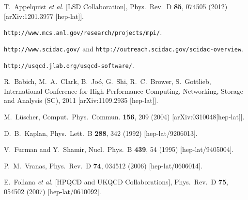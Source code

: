 \begin{thebibliography}{99}
  T.~Appelquist {\it et al.} [LSD Collaboration],
  Phys.\ Rev.\ D {\bf 85}, 074505 (2012)
  [arXiv:1201.3977 [hep-lat]].
  

  
 
{\tt http://www.mcs.anl.gov/research/projects/mpi/}.

{\tt http://www.scidac.gov/} and {\tt http://outreach.scidac.gov/scidac-overview}.
  
{\tt http://usqcd.jlab.org/usqcd-software/}.

  R.~Babich, M.~A.~Clark, B.~Jo\'{o}, G.~Shi, R.~C.~Brower, S.~Gottlieb,
  International Conference for High Performance Computing, Networking, Storage and Analysis (SC), 2011
  [arXiv:1109.2935 [hep-lat]].

  M.\ L\"{u}scher,
  Comput.\ Phys.\ Commun. {\bf 156}, 209 (2004)
  [arXiv:0310048[hep-lat]].
  
  D.~B.~Kaplan,
  Phys.\ Lett.\ B {\bf 288}, 342 (1992)
  [hep-lat/9206013].
  
  V.~Furman and Y.~Shamir,
  Nucl.\ Phys.\ B {\bf 439}, 54 (1995)
  [hep-lat/9405004].
  
  P.~M.~Vranas,
  Phys.\ Rev.\ D {\bf 74}, 034512 (2006)
  [hep-lat/0606014].
  
  E.~Follana {\it et al.}  [HPQCD and UKQCD Collaborations],
  Phys.\ Rev.\ D {\bf 75}, 054502 (2007)
  [hep-lat/0610092].
  

\end{thebibliography}
